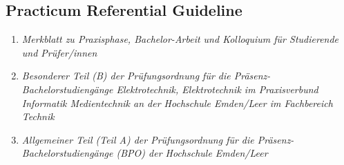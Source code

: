 \documentclass[12pt,a4paper]{article}
\begin{document}


	
	\subsection{Practicum Referential Guideline}
	\begin{enumerate}
		\item \textit{Merkblatt zu Praxisphase, Bachelor-Arbeit und Kolloquium für Studierende und Prüfer/innen }
		\item \textit{Besonderer Teil (B) der Prüfungsordnung
für die Präsenz-Bachelorstudiengänge
Elektrotechnik,
Elektrotechnik im Praxisverbund
		Informatik
Medientechnik
an der Hochschule Emden/Leer
im Fachbereich Technik
}
		\item \textit{Allgemeiner Teil (Teil A) der Prüfungsordnung für die Präsenz-Bachelorstudiengänge (BPO) der Hochschule Emden/Leer}
		
	\end{enumerate}
	\vfill
\end{document}
